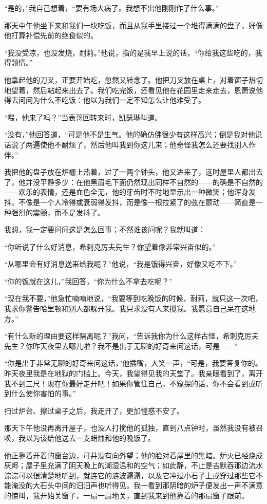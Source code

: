 \par “是的，”我自己想着，“要有场大病了。我想不出他刚刚作了什么事。”
\par 那天中午他坐下来和我们一块吃饭，而且从我手里接过一个堆得满满的盘子，好像他打算补偿先前的绝食似的。
\par “我没受凉，也没发烧，耐莉。”他说，指的是我早上说的话，“你给我这些吃的，我得领情。”
\par 他拿起他的刀叉，正要开始吃，忽然又转念了。他把刀叉放在桌上，对着窗子热切地望着，然后站起来出去了。我们吃完饭，还看见他在花园里走来走去，恩萧说他得去问问为什么不吃饭：他以为我们一定不知怎么让他难受了。
\par “喂，他来了吗？”当表哥回转来时，凯瑟琳叫道。
\par “没有，”他回答道，“可是他不是生气。他的确仿佛很少有这样高兴；倒是我对他说话说了两遍使他不耐烦了，然后他叫我到你这儿来；他奇怪我怎么还要找别人作伴。”
\par 我把他的盘子放在炉栅上热着，过了一两个钟头，他又进来了，这时屋里人都出去了，他并没平静多少：在他黑眉毛下面仍然现出同样不自然的——的确是不自然的——欢乐的表情，还是血色全无，他的牙齿时不时地显示出一种微笑；他浑身发抖，不像是一个人冷得或衰弱得发抖，而是像一根拉紧了的弦在颤动——简直是一种强烈的震颤，而不是发抖了。
\par 我想，我一定要问问这是怎么回事；不然谁该问呢？我就叫道：
\par “你听说了什么好消息，希刺克厉夫先生？你望着像非常兴奋似的。”
\par “从哪里会有好消息送来给我呢？”他说，“我是饿得兴奋，好像又吃不下。”
\par “你的饭就在这儿，”我回答，“你为什么不拿去吃呢？”
\par “现在我不要，”他急忙喃喃地说，“我要等到吃晚饭的时候，耐莉，就只这一次吧，我求你警告哈里顿和别人都躲开我。我只求没有人来搅我。我愿意自己呆在这地方。”
\par “有什么新的理由要这样隔离呢？”我问，“告诉我你为什么这样古怪，希刺克厉夫先生？你昨天夜里去哪儿啦？我不是出于无聊的好奇来问这话，可是——”
\par “你是出于非常无聊的好奇来问这话，”他插嘴，大笑一声，“可是，我要答复你的。昨天夜里我是在地狱的门槛上。今天，我望得见我的天堂了。我亲眼看到了，离开我不到三尺！现在你最好走开吧！如果你管住自己，不窥探的话，你不会看到或听到什么使你害怕的事。”
\par 扫过炉台、擦过桌子之后，我走开了，更加惶惑不安了。
\par 那天下午他没再离开屋子，也没人打搅他的孤独，直到八点钟时，虽然我没有被召唤，我以为该给他送去一支蜡烛和他的晚饭了。
\par 他正靠着开着的窗台边，可并没有向外望；他的脸对着屋里的黑暗。炉火已经烧成灰烬；屋子里充满了阴天晚上的潮湿温和的空气；如此静，不止是吉默吞那边流水淙淙可以很清楚地听到，就连它的涟波潺潺，以及它冲过小石子上或穿过那些它不能淹没的大石头中间的汩汩声也听得见。我一看到那阴暗的炉子便发出一声不满意的惊叫，我开始关窗子，一扇一扇地关，直到我来到他靠着的那扇窗子跟前。
